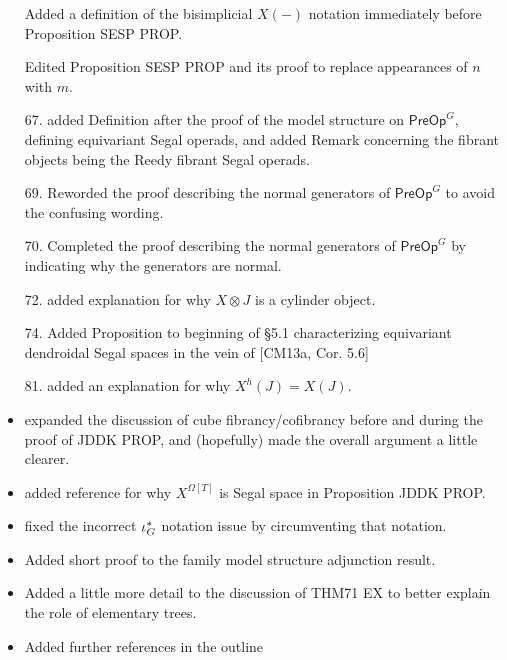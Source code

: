 \documentclass{article}
\begin{document}
\begin{itemize}
Added a definition of the bisimplicial $X(-)$ notation immediately before Proposition SESP PROP.

Edited Proposition SESP PROP and its proof to replace appearances of $n$ with $m$.

\item[67.] added Definition after the proof of the model structure on $\mathsf{PreOp}^G$, defining equivariant Segal operads,
and added Remark concerning the fibrant objects being the Reedy fibrant Segal operads.

\item[69.] Reworded the proof describing the normal generators of $\mathsf{PreOp}^G$ to avoid the confusing wording.

\item[70.] Completed the proof describing the normal generators of $\mathsf{PreOp}^G$ by indicating why the generators are normal.

\item[72.] added explanation for why $X \otimes J$ is a cylinder object.

\item[74.] Added Proposition to beginning of \S 5.1 characterizing equivariant dendroidal Segal spaces in the vein of [CM13a, Cor. 5.6]

\item[81.] added an explanation for why $X^h(J) = X(J)$.


\item expanded the discussion of cube fibrancy/cofibrancy before and during the proof of JDDK PROP, and (hopefully) made the overall argument a little clearer.

\item added reference for why $X^{\Omega[T]}$ is Segal space in Proposition JDDK PROP.

\item fixed the incorrect $\iota^{\**}_G$ notation issue by circumventing that notation.

\item Added short proof to the family model structure adjunction
 result.

\item Added a little more detail to the discussion of THM71 EX to better explain the role of elementary trees.

\item Added further references in the outline

\end{itemize}
\end{document}
